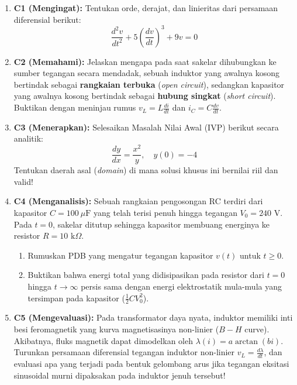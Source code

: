 \documentclass[11pt,a4paper]{article}
\theoremstyle{definition}
\begin{document}
\begin{enumerate}[leftmargin=*]
    \item \textbf{C1 (Mengingat):} 
    Tentukan orde, derajat, dan linieritas dari persamaan diferensial berikut:
    \begin{equation}
        \frac{d^2 v}{dt^2} + 5 \left(\frac{dv}{dt}\right)^3 + 9 v = 0
    \end{equation}
    
    \item \textbf{C2 (Memahami):}
    Jelaskan mengapa pada saat sakelar dihubungkan ke sumber tegangan secara mendadak, sebuah induktor yang awalnya kosong bertindak sebagai \textbf{rangkaian terbuka} (\textit{open circuit}), sedangkan kapasitor yang awalnya kosong bertindak sebagai \textbf{hubung singkat} (\textit{short circuit}). Buktikan dengan meninjau rumus $v_L = L \frac{di}{dt}$ dan $i_C = C \frac{dv}{dt}$.
    
    \item \textbf{C3 (Menerapkan):}
    Selesaikan Masalah Nilai Awal (IVP) berikut secara analitik:
    \begin{equation}
        \frac{dy}{dx} = \frac{x^2}{y}, \quad y(0) = -4
    \end{equation}
    Tentukan daerah asal (\textit{domain}) di mana solusi khusus ini bernilai riil dan valid!
    
    \item \textbf{C4 (Menganalisis):}
    Sebuah rangkaian pengosongan RC terdiri dari kapasitor $C = 100\ \mu\text{F}$ yang telah terisi penuh hingga tegangan $V_0 = 240\text{ V}$. Pada $t = 0$, sakelar ditutup sehingga kapasitor membuang energinya ke resistor $R = 10\text{ k}\Omega$.
    \begin{enumerate}
        \item Rumuskan PDB yang mengatur tegangan kapasitor $v(t)$ untuk $t \ge 0$.
        \item Buktikan bahwa energi total yang didisipasikan pada resistor dari $t = 0$ hingga $t \to \infty$ persis sama dengan energi elektrostatik mula-mula yang tersimpan pada kapasitor ($\frac{1}{2} C V_0^2$).
    \end{enumerate}
    
    \item \textbf{C5 (Mengevaluasi):}
    Pada transformator daya nyata, induktor memiliki inti besi feromagnetik yang kurva magnetisasinya non-linier ($B-H$ curve). Akibatnya, fluks magnetik dapat dimodelkan oleh $\lambda(i) = a \arctan(b i)$. Turunkan persamaan diferensial tegangan induktor non-linier $v_L = \frac{d\lambda}{dt}$, dan evaluasi apa yang terjadi pada bentuk gelombang arus jika tegangan eksitasi sinusoidal murni dipaksakan pada induktor jenuh tersebut!
    

\end{enumerate}
\end{document}
